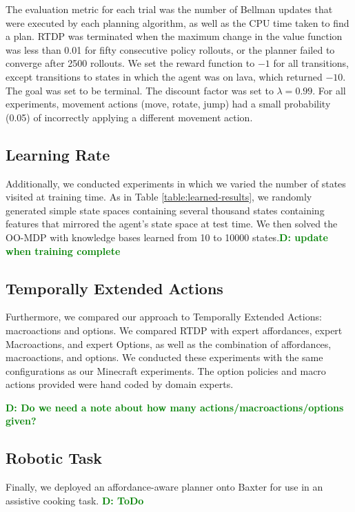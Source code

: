 \documentclass[conference]{IEEEtran}
\newcommand{\dnote}[1]{\textcolor{Green}{\textbf{D: #1}}}
\begin{document}
The evaluation metric for each trial was the
number of Bellman updates that were executed by each planning
algorithm, as well as the CPU time taken to find a plan. RTDP was terminated
when the maximum change in the value function was less than 0.01 for fifty 
consecutive policy rollouts, or the planner failed to converge after 2500 rollouts. 
We set the reward  function to $-1$ for all transitions, except transitions to states in 
which the agent was on lava, which returned $-10$. The goal was set to be 
terminal. The discount factor was set to $\lambda = 0.99$. For all experiments,
movement actions (move, rotate, jump) had a small probability (0.05) of 
incorrectly applying a different movement action.

\subsection{Learning Rate}
Additionally, we conducted experiments in which we varied the number of states visited at training time. 
As in Table \ref{table:learned-results}, we randomly generated simple state spaces
containing several thousand states containing features that mirrored the agent's state
space at test time. We then solved the OO-MDP with knowledge bases learned from 
10 to 10000 states.\dnote{update when training complete}

\subsection{Temporally Extended Actions}
Furthermore, we compared our approach to Temporally Extended Actions: 
macroactions and options. We compared RTDP with expert affordances, 
expert Macroactions, and expert Options, as well as the combination of 
affordances, macroactions, and options. We conducted these experiments 
with the same configurations as our Minecraft experiments. The option policies
and macro actions provided were hand coded by domain experts.

\dnote{Do we need a note about how many actions/macroactions/options given?}

\subsection{Robotic Task}
Finally, we deployed an affordance-aware planner onto Baxter for use
in an assistive cooking task. \dnote{ToDo}
\end{document}

